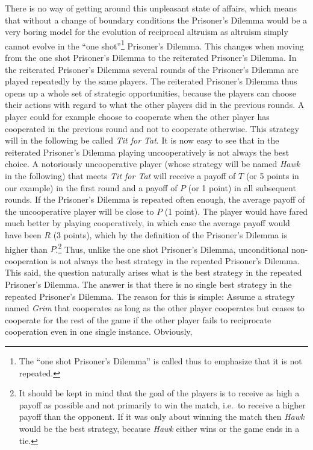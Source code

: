There is no way of getting around this unpleasant state of affairs, which
means that without a change of boundary conditions the Prisoner's Dilemma
would be a very boring model for the evolution of reciprocal altruism as
altruism simply cannot evolve in the ``one shot''\footnote{The ``one shot
  Prisoner's Dilemma'' is called thus to emphasize that it is not repeated.}
Prisoner's Dilemma.  This changes when moving from the one shot Prisoner's
Dilemma to the reiterated Prisoner's Dilemma. In the reiterated Prisoner's
Dilemma several rounds of the Prisoner's Dilemma are played repeatedly by the
same players.  The reiterated Prisoner's Dilemma thus opens up a whole set of
strategic opportunities, because the players can choose their actions with
regard to what the other players did in the previous rounds. A player could
for example choose to cooperate when the other player has cooperated in the
previous round and not to cooperate otherwise. This strategy will in the
following be called {\em Tit for Tat}. It is now easy to see that in the
reiterated Prisoner's Dilemma playing uncooperatively is not always the best
choice. A notoriously uncooperative player (whose strategy will be named {\em
  Hawk} in the following) that meets {\em Tit for Tat} will receive a payoff
of $T$ (or 5 points in our example) in the first round and a payoff of $P$ (or
1 point) in all subsequent rounds. If the Prisoner's Dilemma is repeated often
enough, the average payoff of the uncooperative player will be close to $P$ (1
point). The player would have fared much better by playing cooperatively, in
which case the average payoff would have been $R$ (3 points), which by the
definition of the Prisoner's Dilemma is higher than $P$.\footnote{It should be
  kept in mind that the goal of the players is to receive as high a payoff as
  possible and not primarily to win the match, i.e.\ to receive a higher payoff
  than the opponent. If it was only about winning the match then {\em Hawk}
  would be the best strategy, because {\em Hawk} either wins or the game ends
  in a tie.} Thus, unlike the one shot Prisoner's Dilemma, unconditional
non-cooperation is not always the best strategy in the repeated Prisoner's
Dilemma. This said, the question naturally arises what is the best strategy in
the repeated Prisoner's Dilemma. The answer is that there is no single best
strategy in the repeated Prisoner's Dilemma. The reason for this is simple:
Assume a strategy named {\em Grim} that cooperates as long as the other player
cooperates but ceases to cooperate for the rest of the game if the other
player fails to reciprocate cooperation even in one single instance. Obviously,
